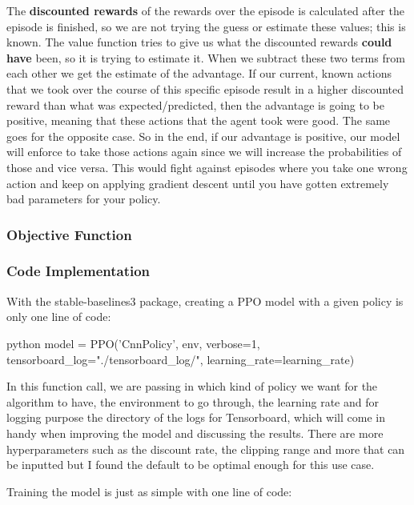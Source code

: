 \documentclass{article}
\numberwithin{equation}{section}
\numberwithin{equation}{section}
\begin{document}
The \textbf{discounted rewards} of the rewards over the episode is calculated after the episode is finished, so we are not trying the guess or estimate these values; this is known. The value function tries to give us what the discounted rewards \textbf{could have} been, so it is trying to estimate it. When we subtract these two terms from each other we get the estimate of the advantage. If our current, known actions that we took over the course of this specific episode result in a higher discounted reward than what was expected/predicted, then the advantage is going to be positive, meaning that these actions that the agent took were good. The same goes for the opposite case. So in the end, if our advantage is positive, our model will enforce to take those actions again since we will increase the probabilities of those and vice versa. This would fight against episodes where you take one wrong action and keep on applying gradient descent until you have gotten extremely bad parameters for your policy.



\subsubsection*{Objective Function}






\subsubsection*{Code Implementation}
With the stable-baselines3 package, creating a PPO model with a given policy is only one line of code:

\begin{mintedbox}{python}
model = PPO('CnnPolicy', env, verbose=1, tensorboard_log="./tensorboard_log/", learning_rate=learning_rate)
\end{mintedbox}

In this function call, we are passing in which kind of policy we want for the algorithm to have, the environment to go through, the learning rate and for logging purpose the directory of the logs for Tensorboard, which will come in handy when improving the model and discussing the results. There are more hyperparameters such as the discount rate, the clipping range and more that can be inputted but I found the default to be optimal enough for this use case.

Training the model is just as simple with one line of code:
\end{document}
